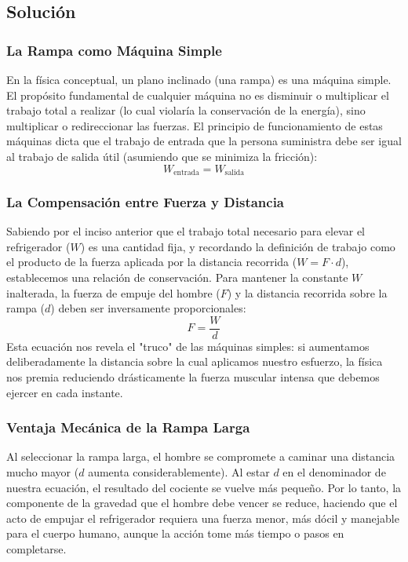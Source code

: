 \documentclass[a4paper,12pt]{article}
\begin{document}
\subsection*{Solución}

\subsubsection*{La Rampa como Máquina Simple}
En la física conceptual, un plano inclinado (una rampa) es una máquina simple. El propósito fundamental de cualquier máquina no es disminuir o multiplicar el trabajo total a realizar (lo cual violaría la conservación de la energía), sino multiplicar o redireccionar las fuerzas. El principio de funcionamiento de estas máquinas dicta que el trabajo de entrada que la persona suministra debe ser igual al trabajo de salida útil (asumiendo que se minimiza la fricción):
$$W_{\text{entrada}} = W_{\text{salida}}$$

\subsubsection*{La Compensación entre Fuerza y Distancia}
Sabiendo por el inciso anterior que el trabajo total necesario para elevar el refrigerador ($W$) es una cantidad fija, y recordando la definición de trabajo como el producto de la fuerza aplicada por la distancia recorrida ($W = F \cdot d$), establecemos una relación de conservación. 
Para mantener la constante $W$ inalterada, la fuerza de empuje del hombre ($F$) y la distancia recorrida sobre la rampa ($d$) deben ser inversamente proporcionales:
$$F = \frac{W}{d}$$
Esta ecuación nos revela el "truco" de las máquinas simples: si aumentamos deliberadamente la distancia sobre la cual aplicamos nuestro esfuerzo, la física nos premia reduciendo drásticamente la fuerza muscular intensa que debemos ejercer en cada instante.

\subsubsection*{Ventaja Mecánica de la Rampa Larga}
Al seleccionar la rampa larga, el hombre se compromete a caminar una distancia mucho mayor ($d$ aumenta considerablemente). Al estar $d$ en el denominador de nuestra ecuación, el resultado del cociente se vuelve más pequeño. Por lo tanto, la componente de la gravedad que el hombre debe vencer se reduce, haciendo que el acto de empujar el refrigerador requiera una fuerza menor, más dócil y manejable para el cuerpo humano, aunque la acción tome más tiempo o pasos en completarse.
\end{document}
